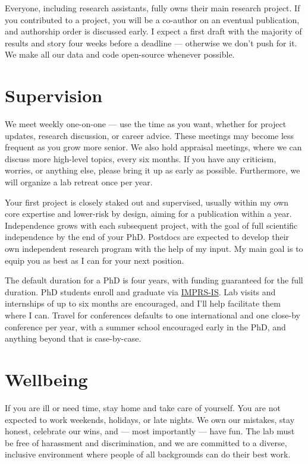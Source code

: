  Everyone, including research assistants, fully owns
their main research project. If you contributed to a project, you will be a co-author
on an eventual publication, and authorship order is discussed early. I expect a
first draft with the majority of results and story four weeks before a deadline
— otherwise we don't push for it. We make all our data and code open-source
whenever possible.

\section*{Supervision}
 We meet weekly one-on-one — use the time as you want, whether
for project updates, research discussion, or career advice. These meetings may
become less frequent as you grow more senior. We also hold appraisal meetings,
where we can discuss more high-level topics, every six months. If you have any
criticism, worries, or anything else, please bring it up as early as possible.
Furthermore, we will organize a lab retreat once per year.

 Your first project is closely staked out and supervised,
usually within my own core expertise and lower-risk by design, aiming for a
publication within a year. Independence grows with each subsequent project, with
the goal of full scientific independence by the end of your PhD. Postdocs are
expected to develop their own independent research program with the help of my
input. My main goal is to equip you as best as I can for your next position.

 The default duration for a PhD is four years, with funding
guaranteed for the full duration. PhD students enroll and graduate via
\href{https://imprs.is.mpg.de/}{IMPRS-IS}. Lab visits and internships of up to
six months are encouraged, and I'll help facilitate them where I can. Travel for
conferences defaults to one international and one close-by conference per year, with a
summer school encouraged early in the PhD, and anything beyond that is
case-by-case.

\section*{Wellbeing}
If you are ill or need time, stay home and take care of yourself. You are not
expected to work weekends, holidays, or late nights. We own our mistakes, stay
honest, celebrate our wins, and — most importantly — have fun. The lab must be
free of harassment and discrimination, and we are committed to a diverse,
inclusive environment where people of all backgrounds can do their best work.


